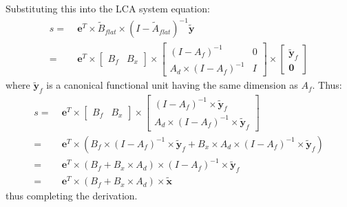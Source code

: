 Substituting this into the LCA system equation:
\begin{align}
  s =\;& \mathbf{e}^T\times \tilde{B}_{flat}\times(I-\tilde{A}_{flat})^{-1}\tilde{\mathbf{y}}\\
  =\;& \mathbf{e}^T\times \left[\begin{array}{cc} B_f & B_x \end{array}\right]\times
  \left[\begin{array}{cc} (I-A_f)^{-1} & 0 \\ A_d\times(I-A_f)^{-1} & I \end{array}\right]
  \times\left[\begin{array}{c} \tilde{\mathbf{y}}_f \\ \mathbf{0}\end{array}\right]
\end{align}
where $\tilde{\mathbf{y}}_f$ is a canonical functional unit having the same dimension as $A_f$.  Thus:
\begin{align}
s =\;& \mathbf{e}^T\times \left[\begin{array}{cc} B_f & B_x \end{array}\right]\times
 \left[\begin{array}{c} (I-A_f)^{-1}\times\tilde{\mathbf{y}}_f \\ A_d\times(I-A_f)^{-1}\times\tilde{\mathbf{y}}_f\end{array}\right]\\
 =\;& \mathbf{e}^T\times \left(B_f\times(I-A_f)^{-1}\times\tilde{\mathbf{y}}_f
 + B_x\times A_d\times(I-A_f)^{-1}\times\tilde{\mathbf{y}}_f\right)\\
 =\;& \mathbf{e}^T\times \left(B_f + B_x\times A_d\right)\times(I-A_f)^{-1}\times \tilde{\mathbf{y}}_f\\
 =\;& \mathbf{e}^T\times \left(B_f + B_x\times A_d\right)\times \tilde{\mathbf{x}}
\end{align}
thus completing the derivation.
